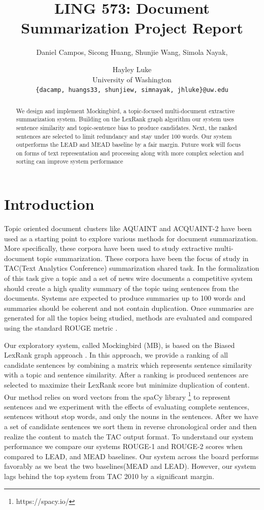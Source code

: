 \documentclass[11pt,a4paper]{article}
\title{LING 573: Document Summarization Project Report}
\author{Daniel Campos, Sicong Huang, Shunjie Wang, Simola Nayak, \and Hayley Luke \\ University of Washington \\ {\tt\{dacamp, huangs33, shunjiew, simnayak, jhluke\}@uw.edu}}
\begin{document}
\maketitle
\begin{abstract}
We design and implement Mockingbird, a topic-focused multi-document extractive summarization system. Building on the LexRank graph algorithm our system uses sentence similarity and topic-sentence bias to produce candidates. Next, the ranked sentences are selected to limit redundancy and stay under 100 words. Our system outperforms the LEAD and MEAD baseline by a fair margin. Future work will focus on forms of text representation and processing along with more complex selection and sorting can improve system performance
\end{abstract}
\section{Introduction}
Topic oriented document clusters like AQUAINT \cite{Graff2002TheAC} and ACQUAINT-2 have been used as a starting point to explore various methods for document summarization. More specifically, these corpora have been used to study extractive multi-document topic summarization. These corpora have been the focus of study in TAC(Text Analytics Conference) \cite{Dang2008OverviewOT} summarization shared task. In the formalization of this task give a topic and a set of news wire documents a competitive system should create a high quality summary of the topic using sentences from the documents. Systems are expected to produce summaries up to 100 words and summaries should be coherent and not contain duplication. Once summaries are generated for all the topics being studied, methods are evaluated and compared using the standard ROUGE metric \cite{Lin2004ROUGEAP}.

Our exploratory system, called Mockingbird (MB), is based on the Biased LexRank graph approach \cite{Otterbacher2009BiasedLP}. In this approach, we provide a ranking of all candidate sentences by combining a matrix which represents sentence similarity with a topic and sentence similarity. After a ranking is produced sentences are selected to maximize their LexRank score but minimize duplication of content. Our method relies on word vectors \cite{Mikolov2013DistributedRO} from the spaCy library \footnote{https://spacy.io/} to represent sentences and we experiment with the effects of evaluating complete sentences, sentences without stop words, and only the nouns in the sentences. After we have a set of candidate sentences we sort them in reverse chronological order and then realize the content to match the TAC output format. To understand our system performance we compare our systems ROUGE-1 and ROUGE-2 scores when compared to LEAD, and MEAD baselines. Our system across the board performs favorably as we beat the two baselines(MEAD and LEAD). However, our system lags behind the top system from TAC 2010 by a significant margin.
\end{document}
